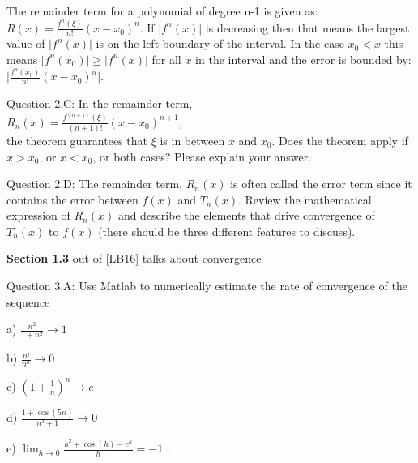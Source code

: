 \documentclass{article}
\renewcommand{\cite}[1]{[#1]}
\def\ds{\displaystyle}
\begin{document}
{\color{teal}The remainder term for a polynomial of degree n-1 is given as: $ \ds R(x) = \frac {f^n(\xi)}{n!}(x-x_0)^n$. If $\ds \vert f^n(x) \vert$ is decreasing then that means the largest value of $\ds \vert f^n(x) \vert$  is on the left boundary of the interval. In the case $\ds x_0 < x$ this means $\ds \vert f^n(x_0)\vert \ge \vert f^n(x) \vert$ for all $x$ in the interval  and the error is bounded by: $\ds \vert \frac {f^n(x_0)}{n!}(x-x_0)^n \vert$.  }   \medskip \par \noindent
%
Question 2.C: In the remainder term, \\
$\ds R_n(x) =  \frac {f^{(n+1)}(\xi)}{(n+1)!}(x-x_0)^{n+1} $,  \\
the theorem guarantees that $\xi$ is in between $x$ and $\ds x_0$. Does the theorem apply if $\ds x>x_0$, or $\ds x<x_0$, or both cases? Please explain your answer. 
\medskip \par \noindent
%
Question 2.D: The remainder term, $R_n(x)$  is often called the error term since it contains the error between $f(x)$ and $\ds T_n(x)$. Review the mathematical expression of $\ds R_n(x)$ and describe the elements that drive convergence of $\ds T_n(x)$ to $f(x)$ (there should be three different features to discuss).
\par \bigskip \par
{\bf Section 1.3} out of \cite{LB16} talks about convergence\\  \par \medskip \noindent
 
\par \medskip \noindent
%
Question 3.A: Use Matlab to numerically estimate the rate of convergence of the sequence \par
a) $\ds \frac {n^2}{1+n^2} \rightarrow 1$ \par
b) $\ds \frac {n!}{n^n} \rightarrow 0$ \par
c) $\ds (1 + \frac 1n)^n \rightarrow e$ \par
d) $\ds \frac {1 + \cos (5n)}{n^3 + 1} \rightarrow 0$ \par
e) $\ds \lim_{h \rightarrow 0}\frac {h^2 + \cos (h) - e^h}h = -1$
. 
\end{document}
